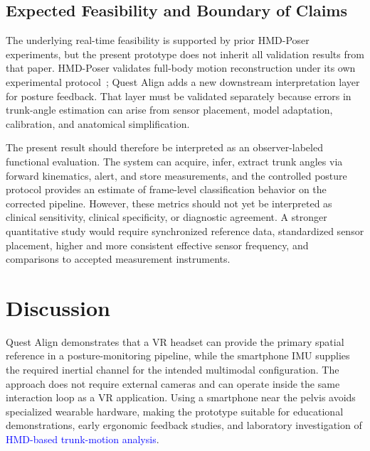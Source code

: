 \documentclass[conference]{IEEEtran}
\newcommand{\CC}[1]{\textcolor{blue}{#1}}
\begin{document}
\subsection{Expected Feasibility and Boundary of Claims}
The underlying real-time feasibility is supported by prior HMD-Poser experiments, but the 
present prototype does not inherit all validation results from that paper. HMD-Poser
validates full-body motion reconstruction under its own experimental protocol~\cite{hmdposer};
Quest Align adds a new downstream interpretation layer for posture feedback. That layer
must be validated separately because errors in trunk-angle estimation can arise from sensor
placement, model adaptation, calibration, and anatomical simplification.

The present result should therefore be interpreted as an observer-labeled
functional evaluation. The system can acquire, infer, extract trunk angles via forward
kinematics, alert, and store measurements, and the controlled posture protocol provides an
estimate of frame-level classification behavior on the corrected pipeline. However, these
metrics should not yet be interpreted as clinical sensitivity, clinical specificity, or
diagnostic agreement. A stronger quantitative study would require synchronized reference
data, standardized sensor placement, higher and more consistent effective sensor
frequency, and comparisons to accepted measurement instruments.

\section{Discussion}
Quest Align demonstrates that a VR headset can provide the primary spatial reference in a
posture-monitoring pipeline, while the smartphone IMU supplies the required inertial channel
for the intended multimodal configuration. The approach does not require external cameras
and can operate inside the same interaction loop as a VR application. Using a smartphone
near the pelvis avoids specialized wearable hardware, making the prototype suitable for
educational demonstrations, early ergonomic feedback studies, and laboratory investigation
of \CC{HMD-based trunk-motion analysis}.
\end{document}
